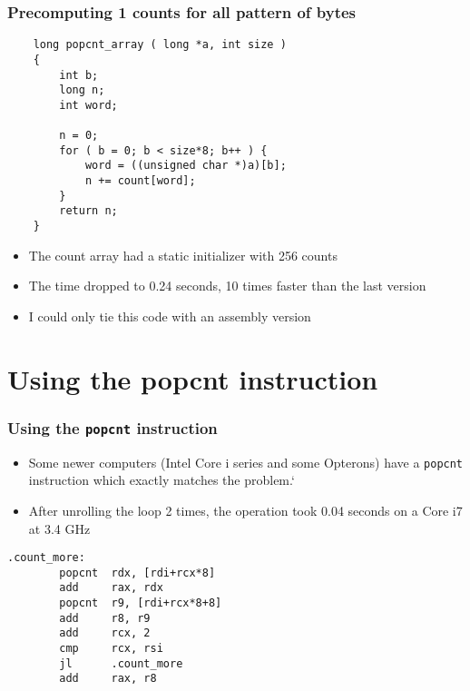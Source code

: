 \documentclass{beamer}
\begin{document}
\begin{frame}[fragile]
    \frametitle{Precomputing 1 counts for all pattern of bytes}
\small
\begin{verbatim}
    long popcnt_array ( long *a, int size )
    {
        int b;
        long n;
        int word;
    
        n = 0;
        for ( b = 0; b < size*8; b++ ) {
            word = ((unsigned char *)a)[b];
            n += count[word];
        }
        return n;
    }
\end{verbatim}
    \begin{itemize}
        \item The count array had a static initializer with 256 counts
        \item The time dropped to 0.24 seconds, 10 times faster than the last version
        \item I could only tie this code with an assembly version
    \end{itemize}
\end{frame}

\section{Using the popcnt instruction}

\begin{frame}[fragile]
    \frametitle{Using the {\tt popcnt} instruction}
    \begin{itemize}
        \item Some newer computers (Intel Core i series and some Opterons) have
              a {\tt popcnt} instruction which exactly matches the problem.`
        \item After unrolling the loop 2 times, the operation took 0.04 seconds
              on a Core i7 at 3.4 GHz
    \end{itemize}
\begin{verbatim}
.count_more:
        popcnt  rdx, [rdi+rcx*8]
        add     rax, rdx
        popcnt  r9, [rdi+rcx*8+8]
        add     r8, r9
        add     rcx, 2
        cmp     rcx, rsi
        jl      .count_more
        add     rax, r8
\end{verbatim}
\end{frame}
\end{document}
